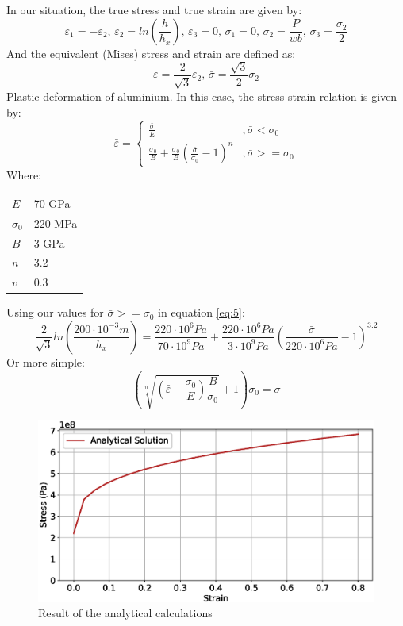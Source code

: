 \documentclass[12pt]{article}
\makeatletter
\newenvironment{conditions}
  {\par\vspace{\abovedisplayskip}\noindent\begin{tabular}{>{$}l<{$} @{${}={}$} l}}
  {\end{tabular}\par\vspace{\belowdisplayskip}}
\makeatother
\begin{document}
In our situation, the true stress and true strain are given by:
\begin{equation}\label{eq:3}
  \varepsilon_{1}=-\varepsilon_{2},\,\varepsilon_{2}=ln(\frac{h}{h_{x}}),\,\varepsilon_{3}=0,\,
  \sigma_{1}=0,\,\sigma_{2}=\frac{P}{wb},\,\sigma_{3}=\frac{\sigma_{2}}{2}
\end{equation}
And the equivalent (Mises) stress and strain are defined as:
\begin{equation}\label{eq:4}
  \bar{\varepsilon}=\frac{2}{\sqrt{3}}\varepsilon_{2},\,\bar{\sigma}=\frac{\sqrt{3}}{2}\sigma_{2}
\end{equation}
Plastic deformation of aluminium. In this case, the stress-strain relation is given by:
\begin{equation}\label{eq:5}
  \bar{\varepsilon} = 
  \begin{cases} 
    \frac{\bar{\sigma}}{E} & ,\bar{\sigma} < \sigma_{0} \\
    \frac{\sigma_{0}}{E}+\frac{\sigma_{0}}{B}(\frac{\bar{\sigma}}{\sigma_{0}}-1)^{n} & ,\bar{\sigma} >= \sigma_{0}
  \end{cases}
\end{equation}
Where:
\begin{conditions}
  E           & 70 GPa \\
  \sigma_{0}  & 220 MPa \\   
  B           & 3 GPa \\
  n           & 3.2 \\
  v           & 0.3
\end{conditions}
\noindent Using our values for $\bar{\sigma} >= \sigma_{0}$ in equation \ref{eq:5}:
\begin{equation}
  \frac{2}{\sqrt{3}}ln(\frac{200 \cdot 10^{-3}m}{h_{x}}) = \frac{220 \cdot 10^6 Pa}{70 \cdot 10^9 Pa}+\frac{220 \cdot 10^6 Pa}{3 \cdot 10^9 Pa}(\frac{\bar{\sigma}}{220 \cdot 10^6 Pa}-1)^{3.2}
\end{equation}
Or more simple:
\begin{equation}
  (\sqrt[n]{(\bar{\varepsilon}-\frac{\sigma_{0}}{E})\frac{B}{\sigma_{0}}}+1)\sigma_{0}=\bar{\sigma}
\end{equation}

\begin{figure}[!htb]
  \centering
  \includegraphics[width=0.9\linewidth]{pics/analytical}
  \caption{Result of the analytical calculations}
  \label{fig:2}
\end{figure}
\end{document}
